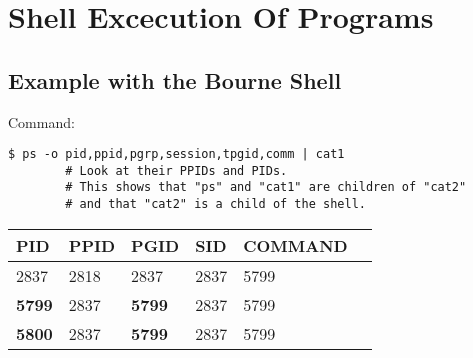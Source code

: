 \documentclass{article}
\renewcommand{\b}[1]{\textbf{#1}}
\begin{document}
\section{Shell Excecution Of Programs}
\subsection{Example with the Bourne Shell}
Command:\newline
\begin{verbatim}
$ ps -o pid,ppid,pgrp,session,tpgid,comm | cat1
        # Look at their PPIDs and PIDs.
        # This shows that "ps" and "cat1" are children of "cat2"
        # and that "cat2" is a child of the shell.
\end{verbatim}

\begin{table}[h!]
    \begin{center}
        \begin{tabular}{l l l l l l}
            PID      & PPID & PGID     & SID & COMMAND \\
            \hline
            2837     & 2818 & 2837     & 2837 & 5799   \\
            \b{5799} & 2837 & \b{5799} & 2837 & 5799   \\
            \b{5800} & 2837 & \b{5799} & 2837 & 5799   \\
        \end{tabular}
    \end{center}
\end{table}
\end{document}
